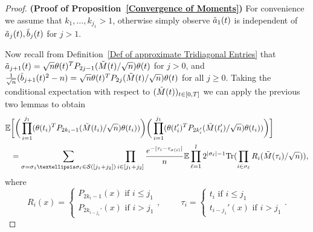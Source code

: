\documentclass{amsart}
\numberwithin{equation}{section}
\newcommand{\E}{\mathbb{E}}
\begin{document}
\begin{proof}\textbf{(Proof of Proposition~\ref{Convergence of Moments})}
For convenience we assume that $k_1,\dots ,k_{j_1}>1$, otherwise simply observe $\Tilde{a}_1(t)$ is independent of $\Tilde{a}_j(t),\Tilde{b}_j(t)$ for $j>1$. 

Now recall from Definition~\ref{Def of approximate Tridiagonal Entries} that $\Tilde{a}_{j+1}(t) = \sqrt{n} \theta(t)^T P_{2j-1}(\Tilde{M}(t)/\sqrt{n})\theta(t)$ for $j>0$, and $\frac{1}{\sqrt{n}}(\Tilde{b}_{j+1}(t)^2-n)=\sqrt{n} \theta(t)^T P_{2j}(\Tilde{M}(t)/\sqrt{n})\theta(t)$ for all $j \geq 0$. Taking the conditional expectation with respect to $(\Tilde{M}(t))_{t \in [0,T]}$ we can apply the previous two lemmas to obtain
\begin{equation*}
    \begin{split}
        \E&\bigg[ \bigg( \prod_{i=1}^{j_1} (\theta(t_i)^T P_{2k_i-1}(\Tilde{M}(t_i)/\sqrt{n})\theta(t_i))\bigg)\bigg( \prod_{i=1}^{j_1} (\theta(t_i')^T P_{2k_i'}(\Tilde{M}(t_i')/\sqrt{n})\theta(t_i))\bigg)\bigg] \\
        &=\sum_{\sigma=\sigma_1\dots \sigma_{\ell} \in \mathcal{S}([j_1+j_2])}\prod_{i \in [j_1+j_2]} \frac{e^{-|\tau_{i}-\tau_{\sigma(i)}|}}{n} \E \prod_{\ell=1}^{l} 2^{|\sigma_{\ell}|-1}\mathrm{Tr}(\prod_{i \in \sigma_{\ell}} R_i(\Tilde{M}(\tau_i)/\sqrt{n})),
    \end{split}
\end{equation*}
where 
\begin{equation*}
    R_i(x)=\begin{cases} P_{2k_i-1}(x) \text{ if } i\leq j_1\\ P_{2k_{i-j_1}'}(x) \text{ if } i>j_1 \end{cases}, \hspace{1cm} \tau_i=\begin{cases} t_i \text{ if } i\leq j_1\\ t_{i-j_1}'(x) \text{ if } i>j_1 \end{cases}. 
\end{equation*} 


\end{proof}
\end{document}
